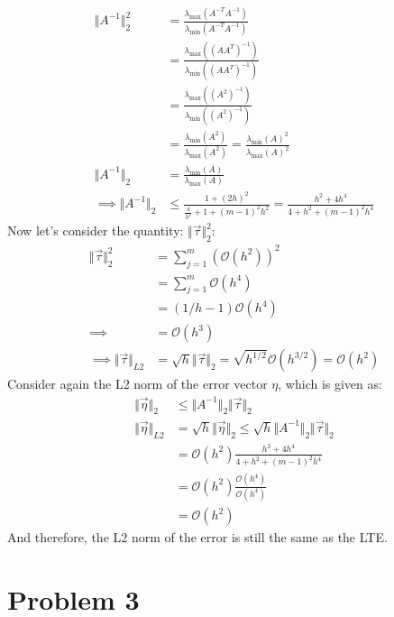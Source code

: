 \documentclass[]{article}
\begin{document}
        \begin{align*}\tag{2.b.3}\label{eqn:2.b.3}
            \Vert A^{-1}\Vert_2^2 &= 
            \frac{
                    \lambda_{\max}(A^{-T}A^{-1})
                }{
                    \lambda_{\min}(A^{-T}A^{-1})
                }
            \\
            &= \frac{
                \lambda_{\max}((AA^T)^{-1})
            }{
                \lambda_{\min}((AA^T)^{-1})
            }
            \\
            &= 
            \frac{\lambda_{\max}((A^2)^{-1})}
            {\lambda_{\min}((A^2)^{-1})}
            \\
            &= 
            \frac{\lambda_{\min}(A^2)}{\lambda_{\max}(A^2)} = 
            \frac{\lambda_{\min}(A)^2}{\lambda_{\max}(A)^2}
            \\
            \Vert A^{-1}\Vert_2 &= 
            \frac{\lambda_{\min}(A)}{\lambda_{\max}(A)}
            \\
            \implies 
            \Vert A^{-1}\Vert_2 &\le 
            \frac{1 + (2h)^2}{\frac{4}{h^2} + 1 + (m - 1)^2h^2}
            = 
            \frac{h^2 + 4h^4}{
                4 + h^2 + (m - 1)^2h^4
            }
        \end{align*}
        Now let's consider the quantity: $\Vert \vec{\tau}\Vert_2^2$: 
        \begin{align*}\tag{2.b.4}\label{eqn:2.b.4}
            \Vert \vec{\tau}\Vert_2^2 &= 
            \sum_{j = 1}^{m} (\mathcal{O}(h^2))^2
            \\
            &= \sum_{j = 1}^{m}
            \mathcal{O}(h^4)
            \\
            &= (1/h - 1)\mathcal{O}(h^4)
            \\
            \implies &= \mathcal{O}(h^3)
            \\
            \implies
            \Vert \vec{\tau}\Vert_{L2} &= \sqrt{h}\Vert \vec{\tau}\Vert_2
            = \sqrt{h^{1/2}}\mathcal{O}(h^{3/2}) = \mathcal{O}(h^2)
        \end{align*}
        Consider again the L2 norm of the error vector $\eta$, which is given as: 
        \begin{align*}\tag{2.b.5}\label{eqn:2.b.5}
            \Vert \vec{\eta}\Vert_2 &\le 
            \Vert A^{-1}\Vert_2\Vert \vec{\tau}\Vert_2
            \\
            \Vert \vec{\eta}\Vert_{L2} &= 
            \sqrt{h}\Vert \vec{\eta}\Vert_2\le 
            \sqrt{h}\Vert A^{-1}\Vert_2\Vert \vec{\tau}\Vert_2
            \\
            &= 
            \mathcal{O}(h^2)\frac{h^2 + 4h^4}{4 + h^2+ (m - 1)^2h^4}
            \\
            &= 
            \mathcal{O}(h^2)\frac{\mathcal{O}(h^4)}{\mathcal{O}(h^4)}
            \\
            &= \mathcal{O}(h^2)
        \end{align*}
        And therefore, the L2 norm of the error is still the same as the LTE. 


\section*{Problem 3}
    
\end{document}
